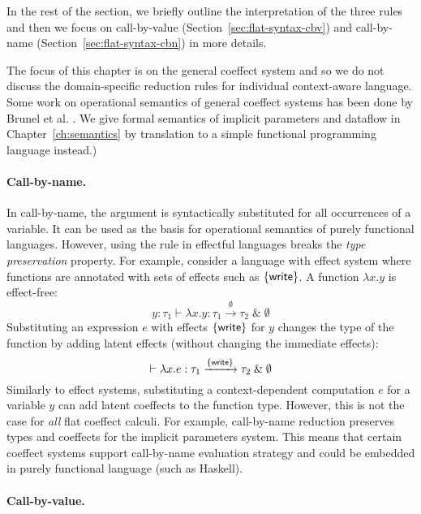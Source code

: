 In the rest of the section, we briefly outline the interpretation of the three
rules and then we focus on call-by-value (Section~\ref{sec:flat-syntax-cbv}) and call-by-name
(Section~\ref{sec:flat-syntax-cbn}) in more details.

The focus of this chapter is on the general coeffect system and so we do not discuss the
domain-specific reduction rules for individual context-aware language. Some work on operational
semantics of general coeffect systems has been done by Brunel et al. \cite{coeffects-quantitative}.
We give formal semantics of implicit parameters and dataflow in Chapter~\ref{ch:semantics} by
translation to a simple functional programming language instead.)

\paragraph{Call-by-name.}
In call-by-name, the argument is syntactically substituted for all occurrences of a variable. It
can be used as the basis for operational semantics of purely functional languages. However, using
the rule in effectful languages breaks the \emph{type preservation} property. For example, consider
a language with effect system where functions are annotated with sets of effects such as $\{ \textnormal{\sffamily write} \}$.
A function $\lambda x.y$ is effect-free:
%
\begin{equation*}
y\!:\!\tau_1 \vdash \lambda x.y : \tau_1 \xrightarrow{\emptyset} \tau_2 \;\&\; \emptyset
\end{equation*}
%
Substituting an expression $e$ with effects $\{ \textnormal{\sffamily write} \}$ for $y$ changes the type of
the function by adding latent effects (without changing the immediate effects):
%
\begin{equation*}
\vdash \lambda x.e : \tau_1 \xrightarrow{ \{ \textnormal{\sffamily write} \} } \tau_2 \;\&\; \emptyset
\end{equation*}
%
Similarly to effect systems, substituting a context-dependent computation $e$ for a variable $y$ can
add latent coeffects to the function type. However, this is not the case for \emph{all} flat coeffect
calculi. For example, call-by-name reduction preserves types and coeffects for the implicit
parameters system. This means that certain coeffect systems support call-by-name evaluation strategy
and could be embedded in purely functional language (such as Haskell).

\paragraph{Call-by-value.}

